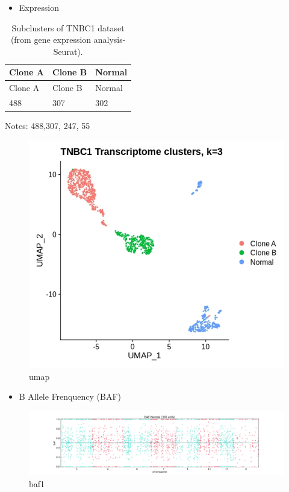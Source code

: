 \documentclass[
]{book}
\providecommand{\tightlist}{%
  \setlength{\itemsep}{0pt}\setlength{\parskip}{0pt}}
\begin{document}
\begin{itemize}
\tightlist
\item
  Expression
\end{itemize}

\begin{longtable}[]{@{}lll@{}}
\caption{Subclusters of TNBC1 dataset (from gene expression analysis-Seurat).}\tabularnewline
\toprule
Clone A & Clone B & Normal\tabularnewline
\midrule
\endfirsthead
\toprule
Clone A & Clone B & Normal\tabularnewline
\midrule
\endhead
488 & 307 & 302\tabularnewline
\bottomrule
\end{longtable}

Notes: 488,307, 247, 55

\begin{figure}
\centering
\includegraphics{CNV_analysis_file/figs/tnbc1-exp/tnbc1-umap-3clusters.jpeg}
\caption{umap}
\end{figure}

\begin{itemize}
\tightlist
\item
  B Allele Frenquency (BAF)
\end{itemize}

\begin{figure}
\centering
\includegraphics[width=1.2\textwidth,height=\textheight]{./CNV_analysis_file/figs/tnbc1-baf/0sub_chr.pdf}
\caption{baf1}
\end{figure}
\end{document}
